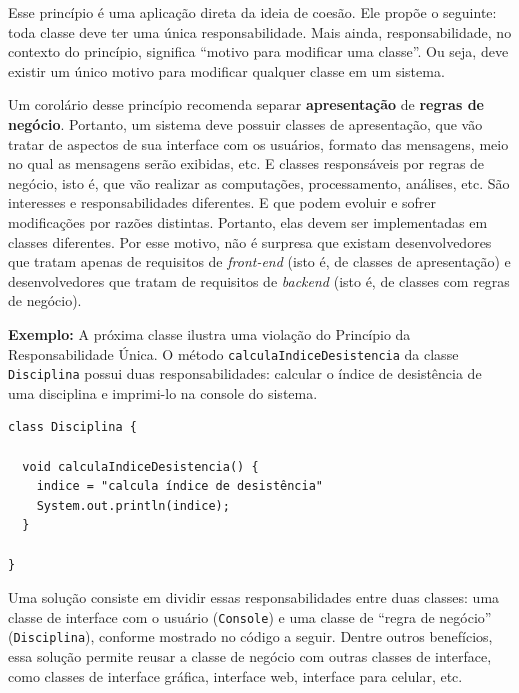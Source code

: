 \documentclass[
  11pt,
  twoside]{book}
\newcommand{\passthrough}[1]{#1}
\begin{document}

Esse princípio é uma aplicação direta da ideia de coesão. Ele propõe o
seguinte: toda classe deve ter uma única responsabilidade. Mais ainda,
responsabilidade, no contexto do princípio, significa ``motivo para
modificar uma classe''. Ou seja, deve existir um único motivo para
modificar qualquer classe em um sistema.

Um corolário desse princípio recomenda separar \textbf{apresentação} de
\textbf{regras de negócio}. Portanto, um sistema deve possuir classes de
apresentação, que vão tratar de aspectos de sua interface com os
usuários, formato das mensagens, meio no qual as mensagens serão
exibidas, etc. E classes responsáveis por regras de negócio, isto é, que
vão realizar as computações, processamento, análises, etc. São
interesses e responsabilidades diferentes. E que podem evoluir e sofrer
modificações por razões distintas. Portanto, elas devem ser
implementadas em classes diferentes. Por esse motivo, não é surpresa que
existam desenvolvedores que tratam apenas de requisitos de
\emph{front-end} (isto é, de classes de apresentação) e desenvolvedores
que tratam de requisitos de \emph{backend} (isto é, de classes com
regras de negócio).

\textbf{Exemplo:} A próxima classe ilustra uma violação do Princípio da
Responsabilidade Única. O método
\passthrough{\lstinline!calculaIndiceDesistencia!} da classe
\passthrough{\lstinline!Disciplina!} possui duas responsabilidades:
calcular o índice de desistência de uma disciplina e imprimi-lo na
console do sistema.

\begin{lstlisting}
class Disciplina {

  void calculaIndiceDesistencia() {
    indice = "calcula índice de desistência"
    System.out.println(indice);
  }

}
\end{lstlisting}

Uma solução consiste em dividir essas responsabilidades entre duas
classes: uma classe de interface com o usuário
(\passthrough{\lstinline!Console!}) e uma classe de ``regra de negócio''
(\passthrough{\lstinline!Disciplina!}), conforme mostrado no código a
seguir. Dentre outros benefícios, essa solução permite reusar a classe
de negócio com outras classes de interface, como classes de interface
gráfica, interface web, interface para celular, etc.

\newpage
\end{document}
